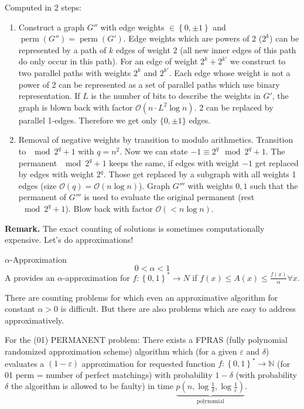 \documentclass[a4paper]{article}
\newcommand{\cls}[1]{\rm{#1}}
\newcommand{\set}[1]{\left\{#1\right\}}
\begin{document}
Computed in 2 steps:
\begin{enumerate}
  \item Construct a graph $G''$ with edge weights $\in \set{0,\pm 1}$
        and $\operatorname{perm}(G'') = \operatorname{perm}(G')$.
        Edge weights which are powers of 2 ($2^k$) can be represented
        by a path of $k$ edges of weight $2$ (all new inner edges of this
        path do only occur in this path). For an edge of weight $2^k + 2^{k'}$
        we construct to two parallel paths with weights $2^k$ and $2^{k'}$.
        Each edge whose weight is not a power of $2$ can be represented as
        a set of parallel paths which use binary representation.
        If $L$ is the number of bits to describe the weights in $G'$,
        the graph is blown back with factor $\mathcal{O}(n\cdot L^2 \log{n})$.
        $2$ can be replaced by parallel 1-edges. Therefore we get
        only $\{0,\pm 1\}$ edges.
  \item Removal of negative weights by transition to modulo arithmetics.
        Transition to $\mod{2^q + 1}$ with $q = n^2$. Now we can state
        $-1 \equiv 2^q \mod{2^q + 1}$. The permanent $\mod{2^q + 1}$
        keeps the same, if edges with weight $-1$ get replaced by edges
        with weight $2^q$. Those get replaced by a subgraph with all
        weights 1 edges (size $\mathcal{O}(q) = \mathcal{O}(n \log{n})$).
        Graph $G'''$ with weights $0,1$ such that the permanent of $G'''$
        is used to evaluate the original permanent (rest $\mod{2^q + 1}$).
        Blow back with factor $\mathcal{O}(<n \log{n})$.
\end{enumerate}

\textbf{Remark.}
The exact counting of solutions is sometimes computationally expensive.
Let's do approximations!

$\alpha$-Approximation
\[
  0 < \alpha < 1
\]
A provides an $\alpha$-approximation for $f: \set{0,1}^* \rightarrow N$
if $f(x) \leq A(x) \leq \frac{f(x)}{\alpha} \forall x$.

There are counting problems for which even an approximative algorithm
for constant $\alpha > 0$ is difficult. But there are also problems
which are easy to address approximatively.

For the (01) PERMANENT problem: There exists a \cls{FP}RAS (fully polynomial
randomized approximation scheme) algorithm which (for a given $\varepsilon$
and $\delta$) evaluates a $(1-\varepsilon)$ approximation for requested
function $f: \set{0,1}^* \rightarrow \mathbb{N}$ (for 01 perm = number
of perfect matchings) with probability $1 - \delta$ (with probability
$\delta$ the algorithm is allowed to be faulty) in time
$\underbrace{p(n, \log{\frac{1}{\delta}}, \log{\frac{1}{\varepsilon}})}_{\text{polynomial}}$.
\end{document}
